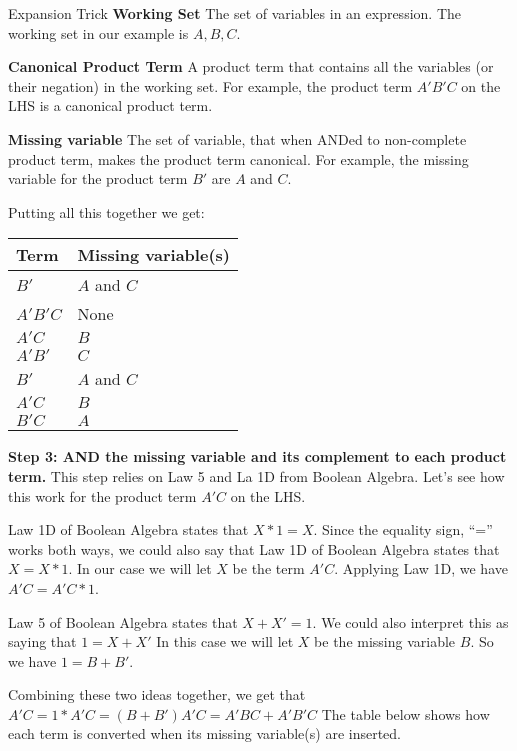 \begin{process}{Expansion Trick}
\tabitem \textbf{Working Set} The set of variables in an expression. The working set in our example is ${A, B, C}$.

\tabitem \textbf{Canonical Product Term} A product term that contains all the variables (or their negation)
in the working set.
For example, the product term $A'B'C$ on the LHS is a canonical product term.

\tabitem \textbf{Missing variable} The set of variable, that when ANDed to non-complete product term, makes
the product term canonical.
For example, the missing variable for the product term $B'$ are $A$ and $C$.

Putting all this together we get:

\begin{tabular}[ht]{l|l}
Term        & Missing variable(s)        \\ \hline
$B'$        & $A$ and $C$            \\ \hline
$A'B'C$    & None                    \\ \hline
$A'C$        & $B$                        \\ \hline

$A'B'$        & $C$                        \\ \hline
$B'$        & $A$ and $C$            \\ \hline
$A'C$        & $B$                        \\ \hline
$B'C$        & $A$                        \\
\end{tabular}
\vspace{0.2cm}

\textbf{Step 3: AND the missing variable and its complement to each product term.}
This step relies on Law 5 and La 1D from Boolean Algebra.  Let's see how this work for the
product term $A'C$ on the LHS.

Law 1D of Boolean Algebra states that $X*1 = X$. Since the
equality sign, ``='' works both ways, we could also say that Law 1D of Boolean Algebra states
that $X = X*1$.  In our case we will let $X$ be the term $A'C$.  Applying Law 1D, we have
$A'C = A'C*1$.

Law 5 of Boolean Algebra states that $X+X' = 1$.  We could also interpret this as saying that
$1 = X+X'$  In this case we will let $X$ be the missing variable $B$.  So we have
$1 = B+B'$.

Combining these two ideas together, we get that $A'C = 1*A'C = (B+B')A'C = A'BC + A'B'C$
The table below shows how each term is converted when its missing variable(s) are inserted.


\end{process}
